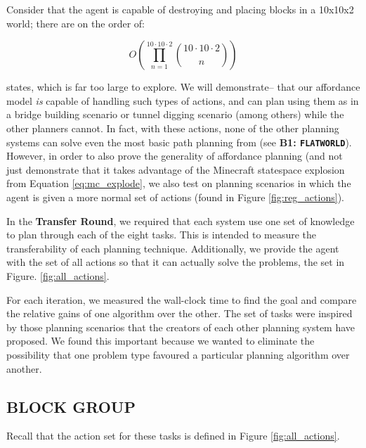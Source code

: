 \documentclass[]{article}
\begin{document}
Consider that the agent is capable of destroying and placing blocks in a 10x10x2 world; there are on the order of:

\begin{equation}
O\left(\prod_{n=1}^{10 \cdot 10 \cdot 2} \binom{10 \cdot 10 \cdot 2}{n}\right)
\label{eq:mc_explode}
\end{equation}

states, which is far too large to explore. We will demonstrate-- that our affordance model {\it is} capable of handling such types of actions, and can plan using them as in a bridge building scenario or tunnel digging scenario (among others) while the other planners cannot. In fact, with these actions, none of the other planning systems can solve even the most basic path planning from (see {\bf B1: \texttt{FLATWORLD}}). However, in order to also prove the generality of affordance planning (and not just demonstrate that it takes advantage of the Minecraft statespace explosion from Equation \ref{eq:mc_explode}, we also test on planning scenarios in which the agent is given a more normal set of actions (found in Figure \ref{fig:reg_actions}).

In the {\bf Transfer Round}, we required that each system use one set of knowledge to plan through each of the eight tasks. This is intended to measure the transferability of each planning technique. Additionally, we provide the agent with the set of all actions so that it can actually solve the problems, the set in Figure. \ref{fig:all_actions}.

For each iteration, we measured the wall-clock time to find the goal and compare the relative gains of one algorithm over the other. The set of tasks were inspired by those planning scenarios that the creators of each other planning system have proposed. We found this important because we wanted to eliminate the possibility that one problem type favoured a particular planning algorithm over another.

\subsection{BLOCK GROUP}

Recall that the action set for these tasks is defined in Figure \ref{fig:all_actions}.
\end{document}
